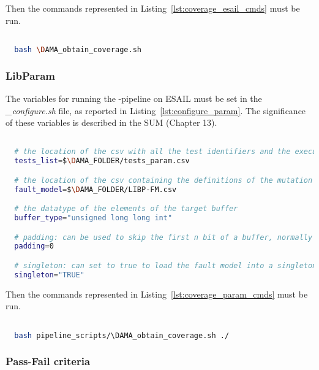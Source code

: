 Then the commands represented in Listing~\ref{lst:coverage_esail_cmds} must be run.

  \begin{lstlisting}[language=bash, label={lst:coverage_esail_cmds}]

  bash \DAMA_obtain_coverage.sh

  \end{lstlisting}

\subsubsection{LibParam}

The variables for running the \DAMA-pipeline on ESAIL must be set in the \emph{\DAMA\_configure.sh} file, as reported in Listing~\ref{lst:configure_param}. The significance of these variables is described in the SUM (Chapter 13).

  \begin{lstlisting}[language=bash, label={lst:configure_param}]

  # the location of the csv with all the test identifiers and the execution time
  tests_list=$\DAMA_FOLDER/tests_param.csv

  # the location of the csv containing the definitions of the mutation operators
  fault_model=$\DAMA_FOLDER/LIBP-FM.csv

  # the datatype of the elements of the target buffer
  buffer_type="unsigned long long int"

  # padding: can be used to skip the first n bit of a buffer, normally set to 0
  padding=0

  # singleton: can set to true to load the fault model into a singleton variable, normally set to "TRUE", can also  be set to "FALSE"
  singleton="TRUE"

  \end{lstlisting}

Then the commands represented in Listing~\ref{lst:coverage_param_cmds} must be run.

  \begin{lstlisting}[language=bash, label={lst:coverage_param_cmds}]

  bash pipeline_scripts/\DAMA_obtain_coverage.sh ./

  \end{lstlisting}

\subsubsection{Pass-Fail criteria}

